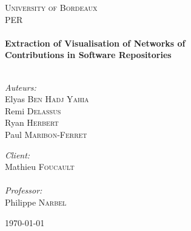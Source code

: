 \begin{titlepage}
\begin{center}


\textsc{\LARGE University of Bordeaux}\\[1.5cm]

\textsc{\Large {PER}}\\[0.5cm]

\HRule \\[0.4cm]
{ \huge \bfseries Extraction of Visualisation of Networks of \\Contributions in Software Repositories}\\[0.4cm]

\HRule \\[1.5cm]

\begin{minipage}{0.4\textwidth}
\begin{flushleft} \large
\emph{Auteurs:} \\
Elyas \textsc{Ben Hadj Yahia}\\
Remi \textsc{Delassus}\\
Ryan \textsc{Herbert}\\
Paul \textsc{Maribon-Ferret}\\
\end{flushleft}
\end{minipage}
\begin{minipage}{0.4\textwidth}
\begin{flushright} \large
\emph{Client:} \\
Mathieu \textsc{Foucault}\\
\emph{\\Professor:} \\
Philippe \textsc{Narbel}
\end{flushright}
\end{minipage}

\vfill

{\large \today}

\end{center}
\end{titlepage}
